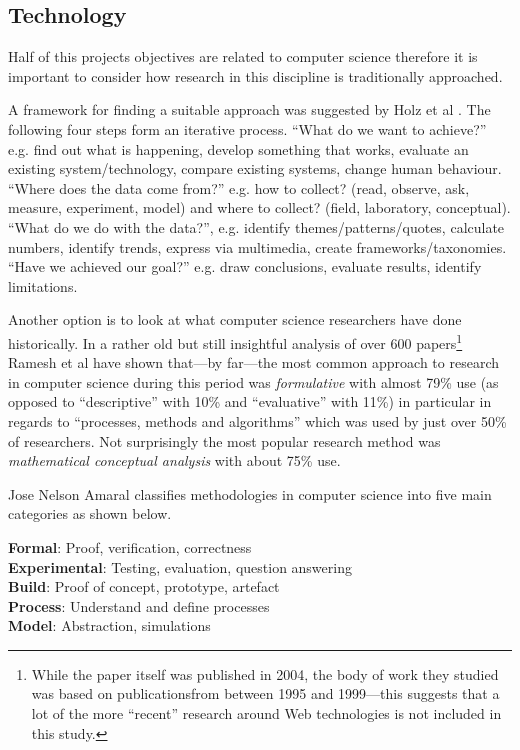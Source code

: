 \subsection{Technology}

Half of this projects objectives are related to computer science therefore it is important to consider how research in this discipline is traditionally approached.

A framework for finding a suitable approach was suggested by Holz et al \citeyear{Holz2006}. The following four steps form an iterative process. ``What do we want to achieve?'' e.g. find out what is happening, develop something that works, evaluate an existing system/technology, compare existing systems, change human behaviour. ``Where does the data come from?'' e.g. how to collect? (read, observe, ask, measure, experiment, model) and where to collect? (field, laboratory, conceptual). ``What do we do with the data?'', e.g. identify themes/patterns/quotes, calculate numbers, identify trends, express via multimedia, create frameworks/taxonomies. ``Have we achieved our goal?'' e.g. draw conclusions, evaluate results, identify limitations.


Another option is to look at what computer science researchers have done historically. In a rather old but still insightful analysis of over \num{600} papers\footnote{While the paper itself was published in 2004, the body of work they studied was based on publicationsfrom between 1995 and 1999---this suggests that a lot of the more ``recent'' research around Web technologies is not included in this study.} Ramesh et al \citeyear{Ramesh2004} have shown that---by far---the most common approach to research in computer science during this period was \emph{formulative} with almost 79\% use (as opposed to ``descriptive'' with 10\% and ``evaluative'' with 11\%) in particular in regards to ``processes, methods and algorithms'' which was used by just over 50\% of researchers. Not surprisingly the most popular research method was \emph{mathematical conceptual analysis} with about 75\% use.

Jose Nelson Amaral \citeyear{Amaral} classifies methodologies in computer science into five main categories as shown below.

\textbf{Formal}: Proof, verification, correctness\\
\textbf{Experimental}: Testing, evaluation, question answering\\
\textbf{Build}: Proof of concept, prototype, artefact\\
\textbf{Process}: Understand and define processes\\
\textbf{Model}: Abstraction, simulations

